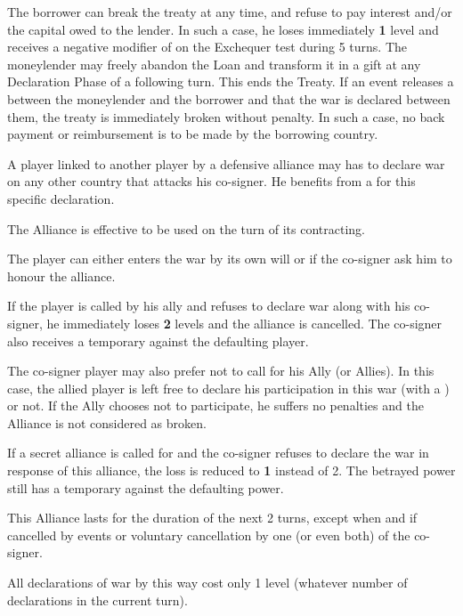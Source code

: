 \bparag The borrower can break the treaty at any time, and refuse to pay
interest and/or the capital owed to the lender. In such a case, he loses
immediately {\bf 1} \STAB level and receives a negative modifier
of  on the Exchequer test during 5 turns.
\bparag The moneylender may freely abandon the Loan and transform it in a gift
at any Declaration Phase of a following turn. This ends the Treaty.
\bparag If an event releases a \CB between the moneylender and the borrower
and that the war is declared between them, the treaty is immediately broken
without penalty. In such a case, no back payment or reimbursement is to be
made by the borrowing country.

\label{chDiplo:Alliance:Defensive Alliance}
A player linked to another player by a defensive alliance may has to declare
war on any other country that attacks his co-signer. He benefits from a \CB
for this specific declaration.

\bparag The Alliance is effective to be used on the turn of its contracting.

\bparag The player can either enters the war by its own will or if the
co-signer ask him to honour the alliance.

\bparag If the player is called by his ally and refuses to declare war along
with his co-signer, he immediately loses {\bf 2} \STAB levels and the alliance
is cancelled. The co-signer also receives a temporary \CB against the
defaulting player.

\bparag The co-signer player may also prefer not to call for his Ally (or
Allies). In this case, the allied player is left free to declare his
participation in this war (with a \CB) or not. If the Ally chooses not to
participate, he suffers no penalties and the Alliance is not considered as
broken.

\bparag If a secret alliance is called for and the co-signer refuses to
declare the war in response of this alliance, the loss is reduced to {\bf 1}
\STAB instead of 2. The betrayed power still has a temporary \CB against the
defaulting power.

\bparag This Alliance lasts for the duration of the next 2 turns, except when
and if cancelled by events or voluntary cancellation by one (or even both) of
the co-signer.

\bparag All declarations of war by this way cost only 1 \STAB level (whatever
number of declarations in the current turn).

